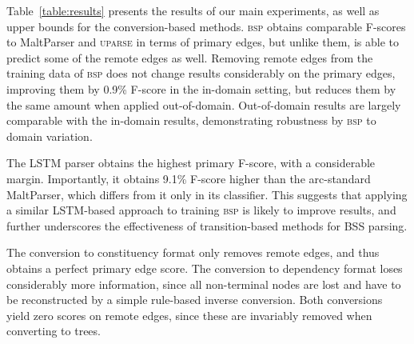 \documentclass[11pt]{article}
\newcommand{\tabref}[1]{Table~\ref{#1}}
\begin{document}
\tabref{table:results} presents the results of our main experiments, as well as
upper bounds for the conversion-based methods.
\textsc{bsp} obtains comparable F-scores to MaltParser and \textsc{uparse}
in terms of primary edges, but unlike them, is able to predict some
of the remote edges as well. 
Removing remote edges from the training data of \textsc{bsp} does not
change results considerably on the primary edges,
improving them by 0.9\% F-score in the in-domain setting, but reduces
them by the same amount when applied out-of-domain. 
Out-of-domain results are largely comparable with the in-domain
results, demonstrating robustness by \textsc{bsp}
to domain variation.

The LSTM parser obtains the highest primary F-score,
with a considerable margin. Importantly, it obtains 9.1\%
F-score higher than the arc-standard MaltParser, which
differs from it only in its classifier.
This suggests that applying a similar LSTM-based approach to
training \textsc{bsp} is likely to improve results,
and further underscores the effectiveness of transition-based 
methods for BSS parsing. 



The conversion to constituency format only removes remote edges,
and thus obtains a perfect primary edge score.
The conversion to dependency format loses considerably more information, since
all non-terminal nodes are lost and have to be reconstructed by a
simple rule-based inverse conversion. Both conversions yield zero scores on remote edges,
since these are invariably removed when converting to trees.
\end{document}
